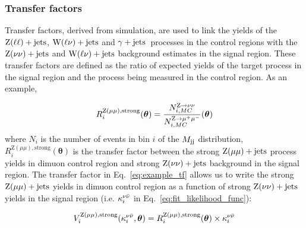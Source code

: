 
\subsubsection{Transfer factors}
\label{subsubsec:transfer_factors}

Transfer factors, derived from simulation,
are used to link the yields of the $\mathrm{Z}(\ell\ell)+\textrm{jets}$, $\textrm{W}(\ell\nu)+\textrm{jets}$ and $\gamma+\textrm{jets}$~processes in the control
regions with the $\textrm{Z}(\nu\nu)+\textrm{jets}$ and $\textrm{W}(\ell\nu)+\textrm{jets}$ background estimates in the signal region.
These transfer factors are defined as the ratio of expected yields of the target process
in the signal region and the process being measured in the control region. As an example,

\begin{equation}
  R_{i}^{\mathrm{Z}(\mu\mu), \mathrm{strong}}(\boldsymbol{\theta}) = \frac{N_{i,MC}^{\mathrm{Z}\to\nu\nu}}{N_{i,MC}^{\mathrm{Z}\to\mu^+\mu^-}}(\boldsymbol{\theta})
  \label{eq:example_tf}
\end{equation}
where $N_{i}$ is the number of events in bin $i$ of the $M_{\textrm{jj}}$ distribution, 
$R_{i}^{\mathrm{Z}(\mu\mu), \mathrm{strong}}(\boldsymbol{\theta})$ is the transfer factor between the 
strong $\mathrm{Z}(\mu\mu)+\textrm{jets}$ process yields in dimuon control region 
and strong $\textrm{Z}(\nu\nu)+\textrm{jets}$ background in the signal region. The transfer factor in
Eq.~\ref{eq:example_tf} allows us to write the strong $\mathrm{Z}(\mu\mu)+\textrm{jets}$ yields
in dimuon control region as a function of strong $\textrm{Z}(\nu\nu)+\textrm{jets}$ yields in the signal region
(i.e. $\kappa_{i}^{\nu\bar{\nu}}$ in Eq.~\ref{eq:fit_likelihood_func}):

\begin{equation}
  V_{i}^{\mathrm{Z}(\mu\mu), \mathrm{strong}}(\kappa_{i}^{\nu\bar{\nu}},\boldsymbol{\theta}) = R_{i}^{\mathrm{Z}(\mu\mu), \mathrm{strong}}(\boldsymbol{\theta}) \times \kappa_{i}^{\nu\bar{\nu}} \\
\end{equation}

